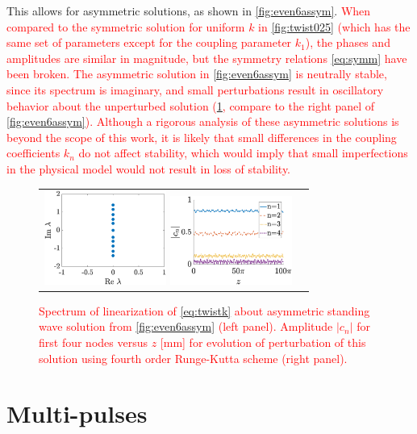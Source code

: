 \documentclass[reprint, amsmath,amssymb,aps,pra]{revtex4-2}
\def\noi{\noindent}
\renewcommand{\revised}[1]{ \textcolor{red}{#1} }
\begin{document}
\noi This allows for asymmetric solutions, as shown in \cref{fig:even6assym}. \revised{When compared to the symmetric solution for uniform $k$ in \cref{fig:twist025} (which has the same set of parameters except for the coupling parameter $k_1$), the phases and amplitudes are similar in magnitude, but the symmetry relations \cref{eq:symm} have been broken. The asymmetric solution in \cref{fig:even6assym} is neutrally stable, since its spectrum is imaginary, and small perturbations result in oscillatory behavior about the unperturbed solution (\cref{fig:assymstab}, compare to the right panel of \cref{fig:even6assym}). Although a rigorous analysis of these asymmetric solutions is beyond the scope of this work, it is likely that small differences in the coupling coefficients $k_n$ do not affect stability, which would imply that small imperfections in the physical model would not result in loss of stability.}

\begin{figure}
    \begin{center}
    \begin{tabular}{cc}
    \includegraphics[width=4cm]{even6assymspec.eps}
    \includegraphics[width=4cm]{assym6pert.eps}
    \end{tabular}
    \end{center}
    \caption{\revised{Spectrum of linearization of \cref{eq:twistk} about asymmetric standing wave solution from \cref{fig:even6assym} (left panel). Amplitude $|c_n|$ for first four nodes versus $z$ [mm] for evolution of perturbation of this solution using fourth order Runge-Kutta scheme (right panel).}}
    \label{fig:assymstab}
    \end{figure}

\section{Multi-pulses}
\end{document}
